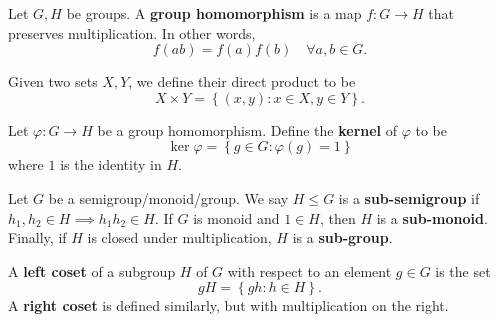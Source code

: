 \begin{df}
Let $G, H$ be groups. A \textbf{group homomorphism} is a map $f : G
\rightarrow H$ that preserves multiplication. In other words,
\[ f(ab) = f(a) f(b) \quad \forall a, b \in G. \]
\end{df}

\begin{df}
Given two sets $X, Y$, we define their direct product to be
\[ X \times Y = \left\lbrace \left(x, y\right) : x \in X, y \in Y
\right\rbrace. \]
\end{df}

\begin{df}
Let $\varphi : G \rightarrow H$ be a group homomorphism. Define the
\textbf{kernel} of $\varphi$ to be
\[ \ker \varphi = \left\lbrace g \in G : \varphi(g) = 1 \right\rbrace \]
where $1$ is the identity in $H$.
\end{df}

\begin{df}
Let $G$ be a semigroup/monoid/group. We say $H \leq G$ is a
\textbf{sub-semigroup} if $h_1, h_2 \in H \implies h_1 h_2 \in H$. If
$G$ is monoid and $1 \in H$, then $H$ is a \textbf{sub-monoid}. Finally,
if $H$ is closed under multiplication, $H$ is a \textbf{sub-group}.
\end{df}

\begin{df}
A \textbf{left coset} of a subgroup $H$ of $G$ with respect to an element $g
\in G$ is the set
\[ gH = \left\lbrace gh : h \in H \right\rbrace. \]
A \textbf{right coset} is defined similarly, but with multiplication on
the right.
\end{df}

